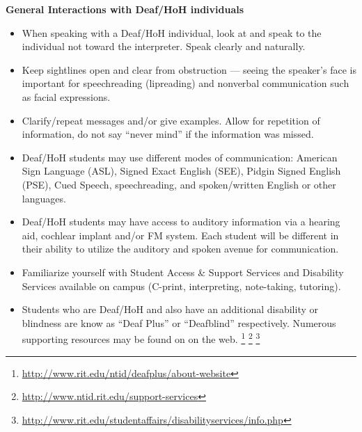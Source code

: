 \documentclass[conference]{IEEEtran}
\begin{document}
\noindent
\textbf{General Interactions with Deaf/HoH individuals}
\begin{itemize}
\item When speaking with a Deaf/HoH individual, look at and speak to the individual not toward the interpreter. Speak clearly and naturally.
\item Keep sightlines open and clear from obstruction --- seeing the speaker's face is important for speechreading (lipreading) and nonverbal communication such as facial expressions.
\item Clarify/repeat messages and/or give examples. Allow for repetition of information, do not say ``never mind'' if the information was missed.
\item Deaf/HoH students may use different modes of communication: American Sign Language (ASL), Signed Exact English (SEE), Pidgin Signed English (PSE), Cued Speech, speechreading, and spoken/written English or other languages.

\item Deaf/HoH students may have access to auditory information via a hearing aid, cochlear implant and/or FM system. Each student will be different in their ability to utilize the auditory and spoken avenue for communication.
\item Familiarize yourself with Student Access \& Support Services and Disability Services available on campus (C-print, interpreting, note-taking, tutoring).
\item Students who are Deaf/HoH and also have an additional disability or blindness are know as ``Deaf Plus'' or ``Deafblind'' respectively. Numerous supporting resources may be found on on the web.
\footnote{\url{http://www.rit.edu/ntid/deafplus/about-website}}
\footnote{\url{http://www.ntid.rit.edu/support-services}}
\footnote{\url{http://www.rit.edu/studentaffairs/disabilityservices/info.php}}

\end{itemize}
\end{document}
